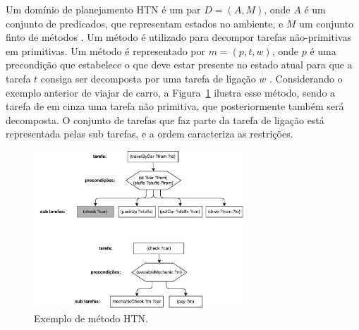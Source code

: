 Um domínio de planejamento HTN é um par $D = (A, M)$, onde $A$ é um conjunto de predicados, que representam estados no ambiente, e $M$ um conjunto finto de métodos \cite{meneguzzi2015planning}. 
Um método é utilizado para decompor tarefas não-primitivas em primitivas. 
Um método é representado por $m = (p, t, w)$, onde $p$ é uma precondição que estabelece o que deve estar presente no estado atual para que a tarefa $t$ consiga ser decomposta por uma tarefa de ligação $w$ \cite{ghallab2004automated}. 
Considerando o exemplo anterior de viajar de carro, a Figura~\ref{fig:htnmethod} ilustra esse método, sendo a tarefa de em cinza uma tarefa não primitiva, que posteriormente também será decomposta. 
O conjunto de tarefas que faz parte da tarefa de ligação está representada pelas sub tarefas, e a ordem caracteriza as restrições. 

\begin{figure}[ht]
	\centering
	\includegraphics[width=0.7\textwidth]{fig/htnmethod.pdf}
	\caption{Exemplo de método HTN.}
	\label{fig:htnmethod}
\end{figure} 

